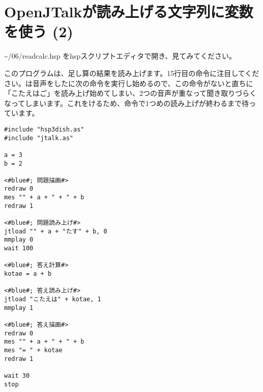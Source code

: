 \newpage
\section{OpenJTalkが読み上げる文字列に変数を使う (2)}
 \textasciitilde /06/readcalc.hsp をhspスクリプトエディタで開き、見てみてください。

このプログラムは、足し算の結果を読み上げます。15行目の命令に注目してください。は音声をしたに次の命令を実行し始めるので、この命令がないと直ちに「こたえはご」を読み上げ始めてしまい、2つの音声が重なって聞き取りづらくなってしまいます。これをけるため、命令で1つめの読み上げが終わるまで待っています。\\

\begin{lstlisting}[caption=readcalc.hsp,label=readcalc.hsp]
#include "hsp3dish.as"
#include "jtalk.as"

a = 3
b = 2

<#blue#; 問題描画#>
redraw 0
mes "" + a + " + " + b
redraw 1

<#blue#; 問題読み上げ#>
jtload "" + a + "たす" + b, 0
mmplay 0
wait 100

<#blue#; 答え計算#>
kotae = a + b

<#blue#; 答え読み上げ#>
jtload "こたえは" + kotae, 1
mmplay 1

<#blue#; 答え描画#>
redraw 0
mes "" + a + " + " + b
mes "= " + kotae
redraw 1

wait 30
stop
\end{lstlisting}

\begin{tcolorbox}[title=\useOmetoi]
\begin{enumerate}
\end{enumerate}
\end{tcolorbox}
